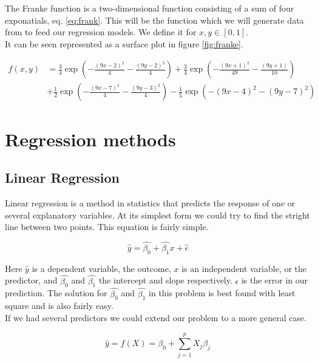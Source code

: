 \documentclass[a4paper,12pt, english]{article}
\begin{document}
The Franke function is a two-dimensional function consisting of a sum of four exponatials, eq. \ref{eq:frank}. This will be the function which we will generate data from to feed our regression models. We define it for $x, y \in [0,1]$. \\
It can be seen represented as a surface plot in figure \ref{fig:franke}.

\begin{align}
f(x,y) &= \frac{3}{4}\exp{\left(-\frac{(9x-2)^2}{4} - \frac{(9y-2)^2}{4}\right)}+\frac{3}{4}\exp{\left(-\frac{(9x+1)^2}{49}- \frac{(9y+1)}{10}\right)} \nonumber \\
&+\frac{1}{2}\exp{\left(-\frac{(9x-7)^2}{4} - \frac{(9y-3)^2}{4}\right)} -\frac{1}{5}\exp{\left(-(9x-4)^2 - (9y-7)^2\right) } \label{eq:frank}
\end{align}




\section*{Regression methods}

\subsection*{Linear Regression}

Linear regression is a method in statistics that predicts the response of one or several explanatory variables. At its simplest form we could try to find the stright line between two points. This equation is fairly simple.

\begin{equation}
\hat{y} = \hat{\beta_{0}} + \hat{\beta_{1}}x + \hat{\epsilon}
\end{equation}

Here $\hat{y}$ is a dependent variable, the outcome, $x$ is an independent variable, or the predictor, and $\hat{\beta_{0}}$ and $\hat{\beta_{1}}$ the intercept and slope respectively. $\epsilon$ is the error in our prediction. The solution for $\hat{\beta_{0}}$ and $\hat{\beta_{1}}$ in this problem is best found with least square and is also fairly easy.\\
If we had several predictors we could extend our problem to a more general case.

\begin{equation}
\hat{y} = f(X) = \beta_{0} + \sum_{j=1}^{p} X_{j} \beta_{j}
\end{equation}
\end{document}
